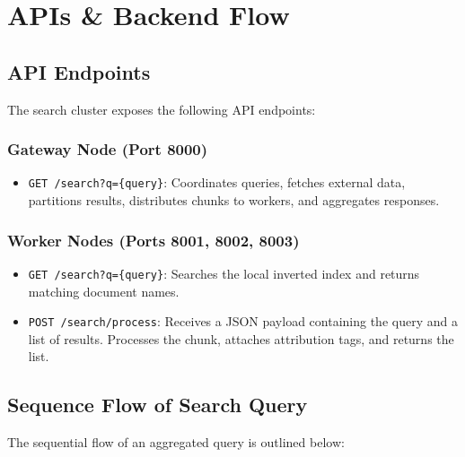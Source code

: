 \documentclass[11pt,a4paper]{article}
\begin{document}
\section{APIs \& Backend Flow}

\subsection{API Endpoints}
The search cluster exposes the following API endpoints:

\subsubsection{Gateway Node (Port 8000)}
\begin{itemize}
    \item \texttt{GET /search?q=\{query\}}:
    Coordinates queries, fetches external data, partitions results, distributes chunks to workers, and aggregates responses.
\end{itemize}

\subsubsection{Worker Nodes (Ports 8001, 8002, 8003)}
\begin{itemize}
    \item \texttt{GET /search?q=\{query\}}:
    Searches the local inverted index and returns matching document names.
    \item \texttt{POST /search/process}:
    Receives a JSON payload containing the query and a list of results. Processes the chunk, attaches attribution tags, and returns the list.
\end{itemize}

\subsection{Sequence Flow of Search Query}
The sequential flow of an aggregated query is outlined below:
\end{document}

